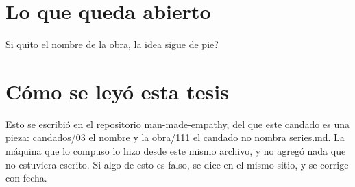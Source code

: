 \documentclass[11pt,a4paper]{article}
\begin{document}
\section{Lo que queda abierto}
\textquestiondown{}Si quito el nombre de la obra, la idea sigue de pie?

\section*{Cómo se leyó esta tesis}
Esto se escribió en el repositorio man-made-empathy, del que este candado es una pieza: candados/03 el nombre y la obra/111 el candado no nombra series.md. La máquina que lo compuso lo hizo desde este mismo archivo, y no agregó nada que no estuviera escrito. Si algo de esto es falso, se dice en el mismo sitio, y se corrige con fecha.
\end{document}
